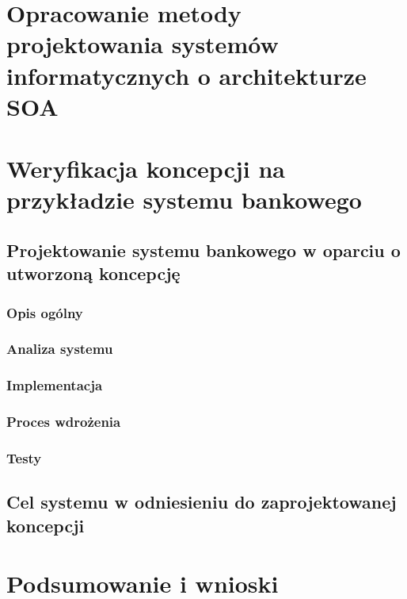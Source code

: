 \chapter{Opracowanie metody projektowania systemów informatycznych o architekturze SOA}

\chapter{Weryfikacja koncepcji na przykładzie systemu bankowego}
\section{Projektowanie systemu bankowego w oparciu o utworzoną koncepcję}
\subsection{Opis ogólny}
\subsection{Analiza systemu}
\subsection{Implementacja}
\subsection{Proces wdrożenia}
\subsection{Testy}
\section{Cel systemu w odniesieniu do zaprojektowanej koncepcji}
\chapter{Podsumowanie i wnioski}
